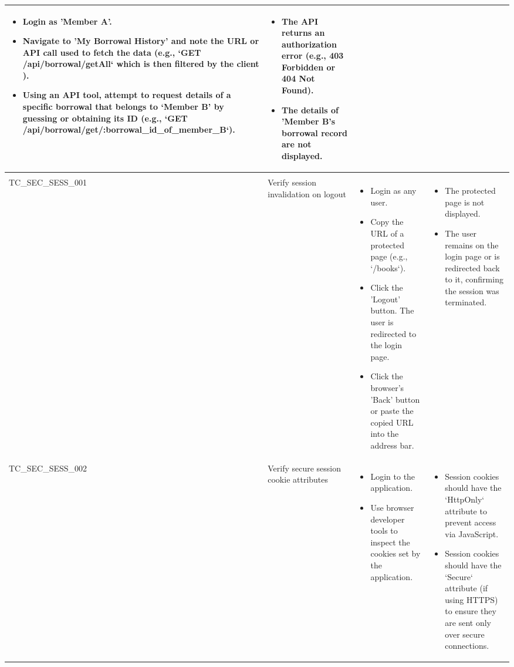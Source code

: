 \documentclass[10pt, a4paper]{report}
\begin{document}
\begin{longtable}{|>{\raggedright\arraybackslash}p{3cm}|>{\raggedright\arraybackslash}p{3cm}|>{\raggedright\arraybackslash}p{5cm}|>{\raggedright\arraybackslash}p{5cm}|}
\begin{itemize}
        \item Login as 'Member A'.
        \item Navigate to 'My Borrowal History' and note the URL or API call used to fetch the data (e.g., `GET /api/borrowal/getAll` which is then filtered by the client ).
        \item Using an API tool, attempt to request details of a specific borrowal that belongs to `Member B' by guessing or obtaining its ID (e.g., `GET /api/borrowal/get/:borrowal\_id\_of\_member\_B`).
    \end{itemize} & 
    \begin{itemize}
        \item The API returns an authorization error (e.g., 403 Forbidden or 404 Not Found).
        \item The details of 'Member B's borrowal record are not displayed.
    \end{itemize} \\ \hline

\multicolumn{4}{|l|}{\textbf{Sub-Section: Session Management}} \\ \hline
TC\_SEC\_SESS\_001 & Verify session invalidation on logout  & 
    \begin{itemize}
        \item Login as any user.
        \item Copy the URL of a protected page (e.g., `/books`).
        \item Click the 'Logout' button. The user is redirected to the login page.
        \item Click the browser's 'Back' button or paste the copied URL into the address bar.
    \end{itemize} & 
    \begin{itemize}
        \item The protected page is not displayed.
        \item The user remains on the login page or is redirected back to it, confirming the session was terminated.
    \end{itemize} \\ \hline
TC\_SEC\_SESS\_002 & Verify secure session cookie attributes & 
    \begin{itemize}
        \item Login to the application.
        \item Use browser developer tools to inspect the cookies set by the application.
    \end{itemize} & 
    \begin{itemize}
        \item Session cookies should have the `HttpOnly` attribute to prevent access via JavaScript.
        \item Session cookies should have the `Secure` attribute (if using HTTPS) to ensure they are sent only over secure connections.
    \end{itemize} \\ \hline


\end{longtable}
\end{document}
